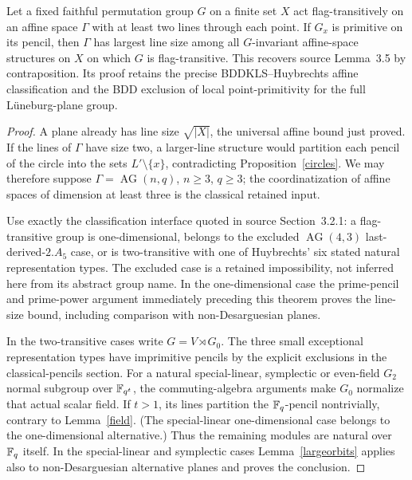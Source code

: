 \begin{theorem}
\label{affinemax}
Let a fixed faithful permutation group $G$ on a finite set $X$ act
flag-transitively on an affine space $\Gamma$ with at least two lines
through each point. If $G_x$ is primitive on its pencil, then
$\Gamma$ has largest line size among all $G$-invariant affine-space
structures on $X$ on which $G$ is flag-transitive.
This recovers source Lemma~3.5 by contraposition. Its proof retains the
precise BDDKLS--Huybrechts affine classification and the BDD exclusion
of local point-primitivity for the full L\"uneburg-plane group.
\end{theorem}
\begin{proof}
A plane already has line size $\sqrt{|X|}$, the universal affine bound
just proved. If the lines of $\Gamma$ have size two, a larger-line
structure would partition each pencil of the circle into the sets
$L'\setminus\{x\}$, contradicting Proposition~\ref{circles}.
We may therefore suppose $\Gamma=\operatorname{AG}(n,q)$,
$n\geq3$, $q\geq3$; the coordinatization of affine spaces of dimension
at least three is the classical retained input.

Use exactly the classification interface quoted in source Section~3.2.1:
a flag-transitive group is one-dimensional, belongs to the excluded
$\operatorname{AG}(4,3)$ last-derived-$2.A_5$ case, or is two-transitive
with one of Huybrechts' six stated natural representation types.
The excluded case is a retained impossibility, not inferred here from
its abstract group name. In the one-dimensional case the prime-pencil
and prime-power argument immediately preceding this theorem proves the
line-size bound, including comparison with non-Desarguesian planes.

In the two-transitive cases write $G=V\rtimes G_0$. The three small
exceptional representation types have imprimitive pencils by the
explicit exclusions in the classical-pencils section. For a natural
special-linear, symplectic or even-field $G_2$ normal subgroup over
$\mathbb F_{q^t}$, the commuting-algebra arguments make $G_0$ normalize that
actual scalar field. If $t>1$, its lines partition the $\mathbb F_q$-pencil
nontrivially, contrary to Lemma~\ref{field}. (The special-linear
one-dimensional case belongs to the one-dimensional alternative.)
Thus the remaining modules are natural over $\mathbb F_q$ itself. In the
special-linear and symplectic cases Lemma~\ref{largeorbits} applies
also to non-Desarguesian alternative planes and proves the conclusion.


\end{proof}
